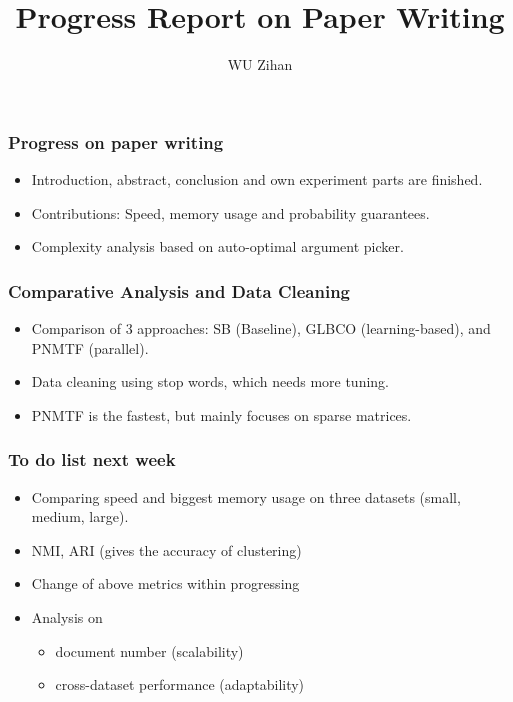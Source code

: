 \documentclass{beamer}
\title{Progress Report on Paper Writing}
\author{WU Zihan}
\begin{document}
\maketitle
\begin{frame}
  \frametitle{Progress on paper writing}
  \begin{itemize}
    \item Introduction, abstract, conclusion and own experiment parts are finished.
    \item Contributions: Speed, memory usage and probability guarantees.
    \item Complexity analysis based on auto-optimal argument picker.
  \end{itemize}
\end{frame}

\begin{frame}
  \frametitle{Comparative Analysis and Data Cleaning}
  \begin{itemize}
    \item Comparison of 3 approaches: SB (Baseline), GLBCO (learning-based), and PNMTF (parallel).
    \item Data cleaning using stop words, which needs more tuning.
    \item PNMTF is the fastest, but mainly focuses on sparse matrices.
  \end{itemize}
\end{frame}

\begin{frame}
  \frametitle{To do list next week}
  \begin{itemize}
    \item Comparing speed and biggest memory usage on three datasets (small, medium, large).
    \item NMI, ARI (gives the accuracy of clustering)
    \item Change of above metrics within progressing
    \item Analysis on
          \begin{itemize}
            \item document number (scalability)
            \item cross-dataset performance (adaptability)
          \end{itemize}
  \end{itemize}
\end{frame}
\end{document}
